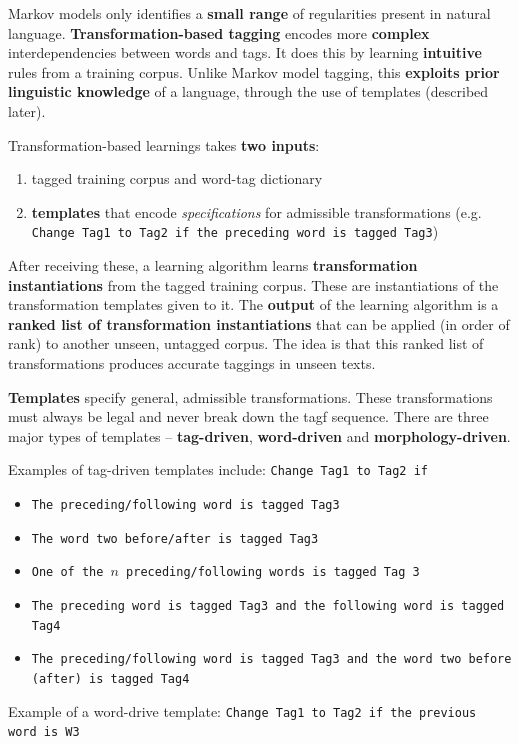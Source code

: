 \documentclass{article}
\begin{document}
Markov models only identifies a \textbf{small range} of regularities present in natural language. \textbf{Transformation-based tagging} encodes more \textbf{complex} interdependencies between words and tags. It does this by learning \textbf{intuitive} rules from a training corpus. Unlike Markov model tagging, this \textbf{exploits prior linguistic knowledge} of a language, through the use of templates (described later). 

Transformation-based learnings takes \textbf{two inputs}:
\begin{enumerate}
	\item tagged training corpus and word-tag dictionary
	\item \textbf{templates} that encode \textit{specifications} for admissible transformations (e.g. \texttt{Change Tag1 to Tag2 if the preceding word is tagged Tag3})
\end{enumerate}
After receiving these, a learning algorithm learns \textbf{transformation instantiations} from the tagged training corpus. These are instantiations of the transformation templates given to it. The \textbf{output} of the learning algorithm is a \textbf{ranked list of transformation instantiations} that can be applied (in order of rank) to another unseen, untagged corpus. The idea is that this ranked list of transformations produces accurate taggings in unseen texts.

\textbf{Templates} specify general, admissible transformations. These transformations must always be legal and never break down the tagf sequence. There are three major types of templates -- \textbf{tag-driven}, \textbf{word-driven} and \textbf{morphology-driven}.

Examples of tag-driven templates include: \texttt{Change Tag1 to Tag2 if}
\begin{itemize}
	\item \texttt{The preceding/following word is tagged Tag3}
	\item \texttt{The word two before/after is tagged Tag3}
	\item \texttt{One of the $n$ preceding/following words is tagged Tag 3}
	\item \texttt{The preceding word is tagged Tag3 and the following word is tagged Tag4}
	\item \texttt{The preceding/following word is tagged Tag3 and the word two before (after) is tagged Tag4}
\end{itemize}

Example of a word-drive template: \texttt{Change Tag1 to Tag2 if the previous word is W3}
\end{document}
